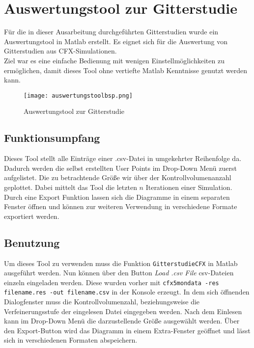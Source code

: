 \chapter{Auswertungstool zur Gitterstudie}
\label{cha:auswertungstool}
Für die in dieser Ausarbeitung durchgeführten Gitterstudien wurde ein Auswertungstool in Matlab erstellt. Es eignet sich für die Auswertung von Gitterstudien aus CFX-Simulationen.\\
Ziel war es eine einfache Bedienung mit wenigen Einstellmöglichkeiten zu ermöglichen, damit dieses Tool ohne vertiefte Matlab Kenntnisse genutzt werden kann.

\begin{figure}[htbp]
	\centering
	\label{fig:auswerungbsp}
	\texttt{[image: auswertungstoolbsp.png]}
	\caption{Auswertungstool zur Gitterstudie}
\end{figure}

\section{Funktionsumpfang}
Dieses Tool stellt alle Einträge einer .csv-Datei in umgekehrter Reihenfolge da. Dadurch werden die selbst erstellten User Points im Drop-Down Menü zuerst aufgelistet. Die zu betrachtende Größe wir über der Kontrollvolumenanzahl geplottet. Dabei mittelt das Tool die letzten $n$ Iterationen einer Simulation. Durch eine Export Funktion lassen sich die Diagramme in einem separaten Fenster öffnen und können zur weiteren Verwendung in verschiedene Formate exportiert werden.

\section{Benutzung}
Um dieses Tool zu verwenden muss die Funktion \texttt{GitterstudieCFX} in Matlab ausgeführt werden. Nun können über den Button \textit{Load .csv File} csv-Dateien einzeln eingeladen werden. Diese wurden vorher mit \texttt{cfx5mondata -res filename.res -out filename.csv} in der Konsole erzeugt. In dem sich öffnenden Dialogfenster muss die Kontrollvolumenzahl, beziehungsweise  die Verfeinerungsstufe der eingelesen Datei eingegeben werden. Nach dem Einlesen kann im Drop-Down Menü die darzustellende Größe ausgewählt werden. Über den Export-Button wird das Diagramm in einem Extra-Fenster geöffnet und lässt sich in verschiedenen Formaten abspeichern.
